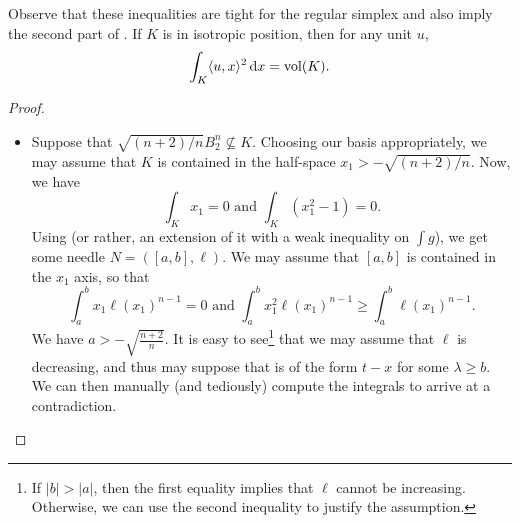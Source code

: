 \documentclass{article}
\begin{document}
		Observe that these inequalities are tight for the regular simplex and also imply the second part of . If $K$ is in isotropic position, then for any unit $u$,
		\[ \int_K \langle u,x\rangle^2 \operatorname{d}\!{x} = \operatorname{vol}(K). \]

		\begin{proof}
			\phantom{agh}
			\begin{itemize}
				\item Suppose that $\sqrt{(n+2)/n}B_2^n\not\subseteq K$. Choosing our basis appropriately, we may assume that $K$ is contained in the half-space $x_1 > -\sqrt{(n+2)/n}$. Now, we have
				\[ \int_K x_1 = 0 \text{ and } \int_K (x_1^2 - 1) = 0. \]
				Using  (or rather, an extension of it with a weak inequality on $\int g$), we get some needle $N=([a,b],\ell)$. We may assume that $[a,b]$ is contained in the $x_1$ axis, so that
				\[ \int_a^b x_1\ell(x_1)^{n-1} = 0 \text{ and } \int_a^b x_1^2\ell(x_1)^{n-1} \geq \int_a^b \ell(x_1)^{n-1}. \]
				We have $a > -\sqrt{\frac{n+2}{n}}$. It is easy to see\footnote{If $|b|>|a|$, then the first equality implies that $\ell$ cannot be increasing. Otherwise, we can use the second inequality to justify the assumption.} that we may assume that $\ell$ is decreasing, and thus may suppose that is of the form $t-x$ for some $\lambda\geq b$. We can then manually (and tediously) compute the integrals to arrive at a contradiction.


\end{itemize}
\end{proof}
\end{document}
